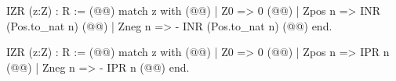 IZR (z:Z) : R := (@\vspace{-0.05cm}@)
  match z with  (@\vspace{-0.05cm}@)
  | Z0 => 0 (@\vspace{-0.05cm}@)
  | Zpos n => INR (Pos.to_nat n) (@\vspace{-0.05cm}@)
  | Zneg n => - INR (Pos.to_nat n) (@\vspace{-0.05cm}@)
  end.

IZR (z:Z) : R := (@\vspace{-0.05cm}@)
  match z with (@\vspace{-0.05cm}@)
  | Z0 => 0 (@\vspace{-0.05cm}@)
  | Zpos n => IPR n (@\vspace{-0.05cm}@)
  | Zneg n => - IPR n (@\vspace{-0.05cm}@)
  end.
